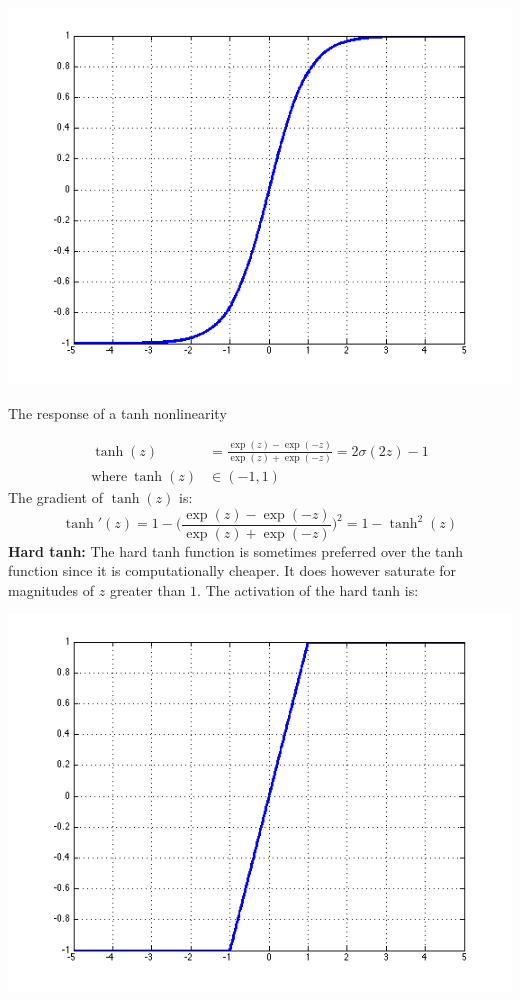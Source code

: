 \documentclass{tufte-handout}
\begin{document}
{\begin{marginfigure}%
  \includegraphics[width=\linewidth]{graph_tanh}
  \caption{The response of a tanh nonlinearity}
  \label{fig:graph_tanh}
\end{marginfigure}
\begin{align*}
  \operatorname{tanh}(z) &=  \frac{\operatorname{exp}(z) - \operatorname{exp}(-z)}{\operatorname{exp}(z) + \operatorname{exp}(-z)} = 2\sigma(2z) - 1\\
  \text{where}~\operatorname{tanh}(z) &\in (-1, 1)
\end{align*}
The gradient of $ \operatorname{tanh}(z) $ is:
$$ \operatorname{tanh}'(z) = 1 - \bigg(\frac{\operatorname{exp}(z) - \operatorname{exp}(-z)}{\operatorname{exp}(z) + \operatorname{exp}(-z)}\bigg)^2 = 1 - \operatorname{tanh}^2(z)$$
\textbf{Hard tanh:}
The hard tanh function is sometimes preferred over the tanh function since it is computationally cheaper. It does however saturate for magnitudes of $z$ greater than $1$. The activation of the hard tanh is:
\begin{marginfigure}%
  \includegraphics[width=\linewidth]{graph_hardtanh}

\end{marginfigure}}
\end{document}
